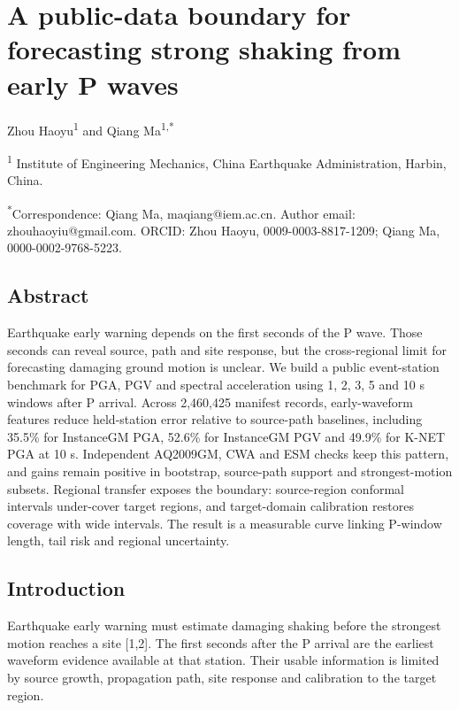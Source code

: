 \documentclass[
  10pt,
]{article}
\author{}
\date{}
\begin{document}
\section{A public-data boundary for forecasting strong shaking from
early P
waves}\label{a-public-data-boundary-for-forecasting-strong-shaking-from-early-p-waves}

Zhou Haoyu\textsuperscript{1} and Qiang Ma\textsuperscript{1,*}

\textsuperscript{1} Institute of Engineering Mechanics, China Earthquake
Administration, Harbin, China.

\textsuperscript{*}Correspondence: Qiang Ma, maqiang@iem.ac.cn. Author
email: zhouhaoyiu@gmail.com. ORCID: Zhou Haoyu, 0009-0003-8817-1209;
Qiang Ma, 0000-0002-9768-5223.

\subsection{Abstract}\label{abstract}

Earthquake early warning depends on the first seconds of the P wave.
Those seconds can reveal source, path and site response, but the
cross-regional limit for forecasting damaging ground motion is unclear.
We build a public event-station benchmark for PGA, PGV and spectral
acceleration using 1, 2, 3, 5 and 10 s windows after P arrival. Across
2,460,425 manifest records, early-waveform features reduce held-station
error relative to source-path baselines, including 35.5\% for InstanceGM
PGA, 52.6\% for InstanceGM PGV and 49.9\% for K-NET PGA at 10 s.
Independent AQ2009GM, CWA and ESM checks keep this pattern, and gains
remain positive in bootstrap, source-path support and strongest-motion
subsets. Regional transfer exposes the boundary: source-region conformal
intervals under-cover target regions, and target-domain calibration
restores coverage with wide intervals. The result is a measurable curve
linking P-window length, tail risk and regional uncertainty.

\subsection{Introduction}\label{introduction}

Earthquake early warning must estimate damaging shaking before the
strongest motion reaches a site {[}1,2{]}. The first seconds after the P
arrival are the earliest waveform evidence available at that station.
Their usable information is limited by source growth, propagation path,
site response and calibration to the target region.
\end{document}
